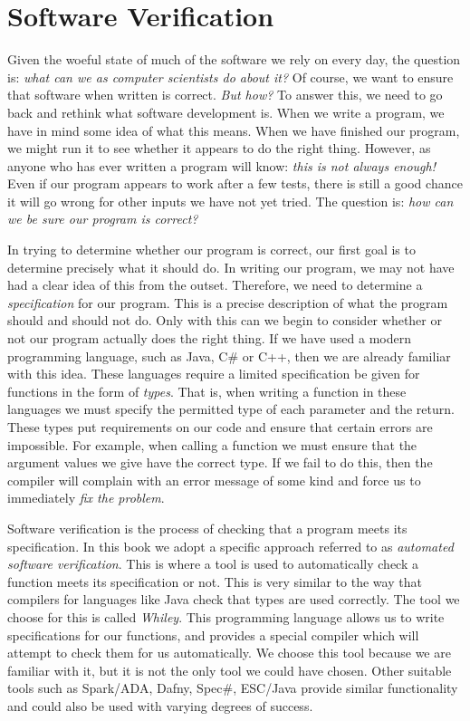 \section{Software Verification}

Given the woeful state of much of the software we rely on every day, the question is: {\em what can we as computer scientists do about it?}  Of course, we want to ensure that software when written is correct.  {\em But how?}  To answer this, we need to go back and rethink what software development is.  When we write a program, we have in mind some idea of what this means.  When we have finished our program, we might run it to see whether it appears to do the right thing.  However, as anyone who has ever written a program will know: {\em this is not always enough!}  Even if our program appears to work after a few tests, there is still a good chance it will go wrong for other inputs we have not yet tried.  The question is: {\em how can we be sure our program is correct?}

In trying to determine whether our program is correct, our first goal is to determine precisely what it should do.  In writing our program, we may not have had a clear idea of this from the outset.  Therefore, we need to determine a {\em specification} for our program.  This is a precise description of what the program should and should not do.  Only with this can we begin to consider whether or not our program actually does the right thing.  If we have used a modern programming language,  such as Java, C\# or C++, then we are already familiar with this idea.  These languages require a limited specification be given for functions in the form of {\em types}.  That is, when writing a function in these languages we must specify the permitted type of each parameter and the return.  These types put requirements on our code and ensure that certain errors are impossible.  For example, when calling a function we must ensure that the argument values we give have the correct type.  If we fail to do this, then the compiler will complain with an error message of some kind and force us to immediately {\em fix the problem}.

Software verification is the process of checking that a program meets its specification.  In this book we adopt a specific approach referred to as {\em automated software verification}.  This is where a tool is used to automatically check a function meets its specification or not.  This is very similar to the way that compilers for languages like Java check that types are used correctly.  The tool we choose for this is called {\em Whiley}.  This programming language allows us to write specifications for our functions, and provides a special compiler which will attempt to check them for us automatically.  We choose this tool because we are familiar with it, but it is not the only tool we could have chosen.  Other suitable tools such as Spark/ADA, Dafny, Spec\#, ESC/Java provide similar functionality and could also be used with varying degrees of success.


